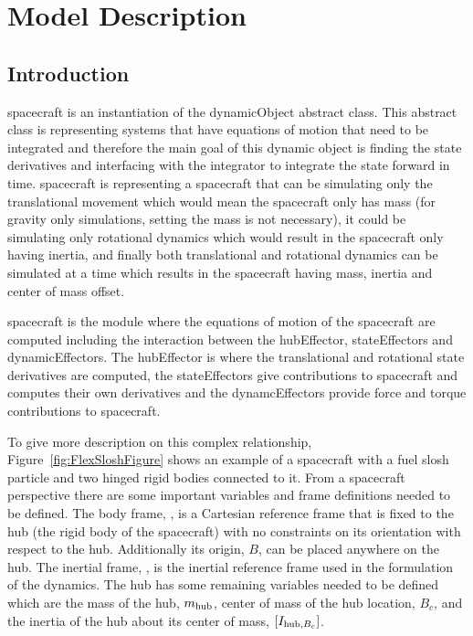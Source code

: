 

\section{Model Description}

\subsection{Introduction}

spacecraft is an instantiation of the dynamicObject abstract class. This abstract class is representing systems that have equations of motion that need to be integrated and therefore the main goal of this dynamic object is finding the state derivatives and interfacing with the integrator to integrate the state forward in time. spacecraft is representing a spacecraft that can be simulating only the translational movement which would mean the spacecraft only has mass (for gravity only simulations, setting the mass is not necessary), it could be simulating only rotational dynamics which would result in the spacecraft only having inertia, and finally both translational and rotational dynamics can be simulated at a time which results in the spacecraft having mass, inertia and center of mass offset.

spacecraft is the module where the equations of motion of the spacecraft are computed including the interaction between the hubEffector, stateEffectors and dynamicEffectors. The hubEffector is where the translational and rotational state derivatives are computed, the stateEffectors give contributions to spacecraft and computes their own derivatives and the dynamcEffectors provide force and torque contributions to spacecraft.

To give more description on this complex relationship, Figure~\ref{fig:FlexSloshFigure} shows an example of a spacecraft with a fuel slosh particle and two hinged rigid bodies connected to it. From a spacecraft perspective there are some important variables and frame definitions needed to be defined. The body frame, , is a Cartesian reference frame that is fixed to the hub (the rigid body of the spacecraft) with no constraints on its orientation with respect to the hub. Additionally its origin, $B$, can be placed anywhere on the hub. The inertial frame, , is the inertial reference frame used in the formulation of the dynamics. The hub has some remaining variables needed to be defined which are the mass of the hub, $m_{\textnormal{hub}}$, center of mass of the hub location, $B_c$, and the inertia of the hub about its center of mass, $[I_{\textnormal{hub},B_c}]$.

